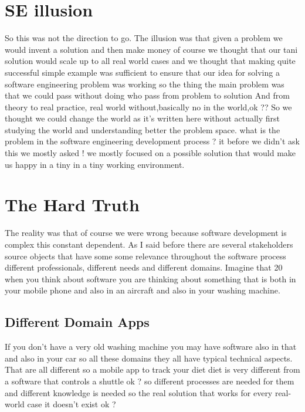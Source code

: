 \documentclass[conference, compsoc, twoside]{IEEEtran}
\begin{document}
\section{SE illusion} %
So this was not the direction to go. The illusion was that given a problem we would invent a solution and then make money of course we thought that our tani solution would scale up to all real world cases and we thought that making quite successful simple example was sufficient to ensure that our idea for solving a software engineering problem was working so the thing the main problem was that we could pass without doing who pass from problem to solution
And from theory to real practice, real world without,basically no in the world,ok ?? 
So we thought we could change the world as it's written here without actually first studying the world and understanding better the problem space. what is the problem in the software engineering development process ? it before we didn't ask this we mostly asked ! 
we mostly focused on a possible solution that would make us happy in a tiny in a tiny working environment.
\section{The Hard Truth} %
\label{sec:the_hard_truth}

The reality was that of course we were wrong because software development is complex this constant dependent. As I said before there are several stakeholders source objects that have some some relevance throughout the software process different professionals, different needs and different domains.
Imagine that 20 when you think about software you are thinking about something that is both in your mobile phone and also in an aircraft and also in your washing machine.
\subsection{Different Domain Apps} %

If you don't have a very old washing machine you may have software also in that and also in your car so all these domains they all have typical technical aspects. 
That are all different so a mobile app to track your diet diet is very different from a software that controls a shuttle ok ? so different processes are needed for them and different knowledge is needed so the real solution that works for every real-world case it doesn't exist ok ? 
\end{document}
